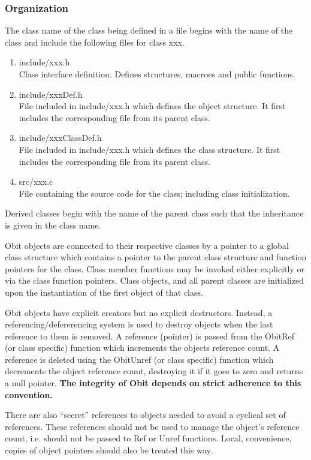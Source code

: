 \documentclass[11pt]{article}
\begin{document}
\subsubsection{Organization}
The class name of the class being defined in a file begins with the
name of the class and include the following files for class xxx.
\begin{enumerate}
\item include/xxx.h\\
Class interface definition.  Defines structures, macroes and public
functions.
\item include/xxxDef.h\\
File included in include/xxx.h which defines the object structure.
It first includes the corresponding file from its parent class.
\item include/xxxClassDef.h\\
File included in include/xxx.h which defines the class structure.
It first includes the corresponding file from its parent class.
\item src/xxx.c\\
File containing the source code for the class; including class initialization.
\end{enumerate}
Derived classes begin with the name of the parent class such that the
inheritance is given in the class name.

Obit objects are connected to their respective classes by a pointer to
a global class structure which contains a pointer to the parent class
structure and function pointers for the class.
Class member functions may be invoked either explicitly or via the
class function pointers.
Class objects, and all parent classes are initialized upon the
instantiation of the first object of that class.

Obit objects have explicit creators but no explicit destructors.
Instead, a referencing/defererencing system is used to destroy objects
when the last reference to them is removed.
A reference (pointer) is passed from the ObitRef (or class specific)
function which increments the objects reference count.
A reference is deleted using the ObitUnref (or class specific)
function which decrements the object reference count, destroying it if
it goes to zero and returns a null pointer.
{\bf The integrity of Obit depends on strict adherence to this
convention.}

   There are also ``secret'' references to objects needed to avoid a
cyclical set of references.
These references should not be used to manage the object's reference
count, i.e. should not be passed to Ref or Unref functions.
Local, convenience, copies of object pointers should also be treated
this way.
\end{document}
